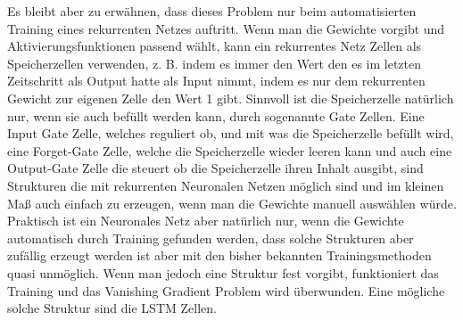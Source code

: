 Es bleibt aber zu erwähnen, dass dieses Problem nur beim automatisierten Training eines rekurrenten Netzes auftritt. Wenn man die Gewichte vorgibt und Aktivierungsfunktionen passend wählt, kann ein rekurrentes Netz Zellen als Speicherzellen verwenden, z. B. indem es immer den Wert den es im letzten Zeitschritt als Output hatte als Input nimmt, indem es nur dem rekurrenten Gewicht zur eigenen Zelle den Wert 1 gibt. Sinnvoll ist die Speicherzelle natürlich nur, wenn sie auch befüllt werden kann, durch sogenannte Gate Zellen. Eine Input Gate Zelle, welches reguliert ob, und mit was die Speicherzelle befüllt wird, eine Forget-Gate Zelle, welche die Speicherzelle wieder leeren kann und auch eine Output-Gate Zelle die steuert ob die Speicherzelle ihren Inhalt ausgibt, sind Strukturen die mit rekurrenten Neuronalen Netzen möglich sind und im kleinen Maß auch einfach zu erzeugen, wenn man die Gewichte manuell auswählen würde. Praktisch ist ein Neuronales Netz aber natürlich nur, wenn die Gewichte automatisch durch Training gefunden werden, dass solche Strukturen aber zufällig erzeugt werden ist aber mit den bisher bekannten Trainingsmethoden quasi unmöglich. Wenn man jedoch eine Struktur fest vorgibt, funktioniert das Training und das Vanishing Gradient Problem wird überwunden. Eine mögliche solche Struktur sind die LSTM Zellen. 
